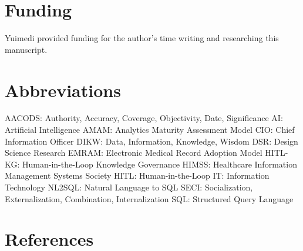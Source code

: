 \documentclass[
  american,
  11pt,
  letterpaper,
  oneside  ,captions=tableheading
]{scrartcl}
\begin{document}
\section{Funding}\label{funding}

Yuimedi provided funding for the author's time writing and researching
this manuscript.

\section{Abbreviations}\label{abbreviations}

AACODS: Authority, Accuracy, Coverage, Objectivity, Date, Significance
AI: Artificial Intelligence AMAM: Analytics Maturity Assessment Model
CIO: Chief Information Officer DIKW: Data, Information, Knowledge,
Wisdom DSR: Design Science Research EMRAM: Electronic Medical Record
Adoption Model HITL-KG: Human-in-the-Loop Knowledge Governance HIMSS:
Healthcare Information Management Systems Society HITL:
Human-in-the-Loop IT: Information Technology NL2SQL: Natural Language to
SQL SECI: Socialization, Externalization, Combination, Internalization
SQL: Structured Query Language

\section{References}\label{references}
\end{document}

